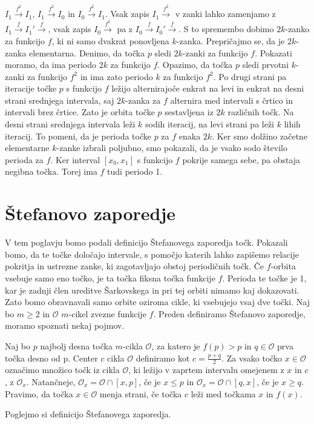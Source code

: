 \documentclass[mat2]{fmfdelo}
\begin{document}
\begin{primer}[6-cikel]
$I_1 \xrightarrow{f^2} I_1$, $I_1 \xrightarrow{f^2} I_0$ in $I_0 \xrightarrow{f^2} I_1$. Vsak zapis $I_1 \xrightarrow{f^2}$ v zanki lahko zamenjamo z $I_1 \xrightarrow{f} I_1'  \xrightarrow{f}$, vsak zapis $I_0 \xrightarrow{f^2} $ pa z $I_0 \xrightarrow{f} I_0'  \xrightarrow{f}$. S to spremembo dobimo $2k$-zanko za funkcijo $f$, ki ni samo dvakrat ponovljena $k$-zanka. Prepričajmo se, da je $2k$-zanka elementarna. Denimo, da točka $p$ sledi $2k$-zanki za funkcijo $f$. Pokazati moramo, da ima periodo $2k$ za funkcijo $f$. Opazimo, da točka $p$ sledi prvotni $k$-zanki za funkcijo $f^2$ in ima zato periodo $k$ za funkcijo $f^2$. Po drugi strani pa iteracije točke $p$ s funkcijo $f$ ležijo alternirajoče enkrat na levi in enkrat na desni strani srednjega intervala, saj $2k$-zanka za $f$ alternira med intervali s črtico in intervali brez črtice. Zato je orbita točke $p$ sestavljena iz $2k$ različnih točk. Na desni strani srednjega intervala leži $k$ sodih iteracij, na levi strani pa leži $k$ lihih iteracij. To pomeni, da je perioda točke $p$ za $f$ enaka $2k$. Ker smo dolžino začetne elementarne $k$-zanke izbrali poljubno, smo pokazali, da je vsako sodo število perioda za $f$. Ker interval $[x_0, x_1]$ s funkcijo $f$ pokrije samega sebe, pa obstaja negibna točka. Torej ima $f$ tudi periodo 1. 
\end{primer}

\section{Štefanovo zaporedje} \label{stefan_zap} 
V tem poglavju bomo podali definicijo Štefanovega zaporedja točk. Pokazali bomo, da te točke določajo intervale, s pomočjo katerih lahko zapišemo relacije pokritja in ustrezne zanke, ki zagotavljajo obstoj periodičnih točk. 
Če $f$-orbita vsebuje samo eno točko, je ta točka fiksna točka funkcije $f$. Perioda te točke je 1, kar je zadnji člen ureditve Šarkovskega in pri tej orbiti nimamo kaj dokazovati. Zato bomo obravnavali samo orbite oziroma cikle, ki vsebujejo vsaj dve točki. Naj bo $m \geq 2$ in $\mathcal{O}$ $m$-cikel zvezne funkcije $f$. Preden definiramo Štefanovo zaporedje, moramo spoznati nekaj pojmov. 

\begin{definicija}
Naj bo $p$ najbolj desna točka $m$-cikla $\mathcal{O}$, za katero je $f(p) > p$ in $q\in \mathcal{O}$ prva točka desno od p. Center $c$ cikla $\mathcal{O}$ definiramo kot $c=\frac{p+q}{2}$. Za vsako točko $x \in \mathcal{O}$ označimo množico točk iz cikla $\mathcal{O}$, ki ležijo v zaprtem intervalu omejenem z $x$ in $c$, z $\mathcal{O}_x$. Natančneje, $\mathcal{O}_x = \mathcal{O} \cap [x, p]$, če je $x \leq p$ in  $\mathcal{O}_x = \mathcal{O} \cap [q, x]$, če je $x \geq q$. Pravimo, da točka $x \in \mathcal{O}$ menja strani, če točka $c$ leži med točkama $x$ in $f(x)$.
\end{definicija}
Poglejmo si definicijo Štefanovega zaporedja.
\end{document}
